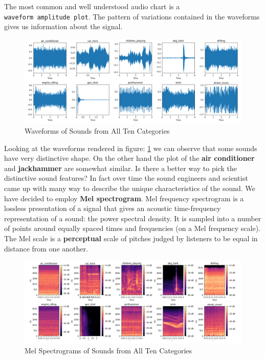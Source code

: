 The most common and well understood audio chart is a
\texttt{waveform\ amplitude\ plot}. The pattern of variations contained
in the waveforms gives us information about the signal.

\begin{Schunk}
\begin{figure}[H]

{\centering \includegraphics[width=1\linewidth]{../images/graphsOfAudioFiles} 

}

\caption[Waveforms of Sounds from All Ten Categories]{Waveforms of Sounds from All Ten Categories}\label{fig:waveform}
\end{figure}
\end{Schunk}

Looking at the waveforms rendered in figure: \ref{fig:waveform} we can
observe that some sounds have very distinctive shape. On the other hand
the plot of the \textbf{air conditioner} and \textbf{jackhammer} are
somewhat similar. Is there a better way to pick the distinctive sound
features? In fact over time the sound engineers and scientist came up
with many way to describe the unique characteristics of the sound. We
have decided to employ \textbf{Mel spectrogram}. Mel frequency
spectrogram is a lossless presentation of a signal that gives an
acoustic time-frequency representation of a sound: the power spectral
density. It is sampled into a number of points around equally spaced
times and frequencies (on a Mel frequency scale). The Mel scale is a
\textbf{perceptual} scale of pitches judged by listeners to be equal in
distance from one another.

\begin{Schunk}
\begin{figure}[H]

{\centering \includegraphics[width=1\linewidth]{../images/melSpecGraphs} 

}

\caption[Mel Spectrograms of Sounds from All Ten Categories]{Mel Spectrograms of Sounds from All Ten Categories}\label{fig:mel}
\end{figure}
\end{Schunk}

